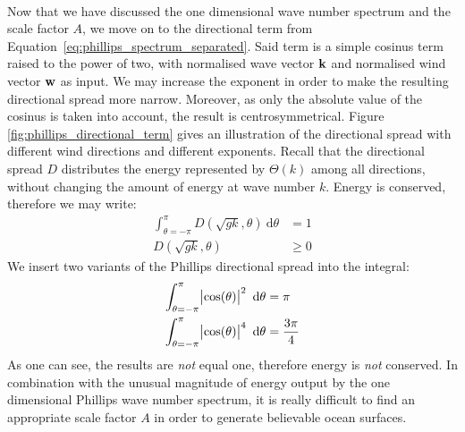%
\\

Now that we have discussed the one dimensional wave number spectrum and the 
scale factor $A$, we move on to the directional term from 
Equation~\ref{eq:phillips_spectrum_separated}. Said term is a simple cosinus 
term raised to the power of two, with normalised wave vector $\mathbf{k}$ and 
normalised wind vector $\mathbf{w}$ as input. We may increase the exponent in 
order to make the resulting directional spread more narrow. Moreover, as only
the  absolute value of the cosinus is taken into account, the result is
centrosymmetrical.
Figure \ref{fig:phillips_directional_term} gives an illustration of the directional 
spread with different wind directions and different exponents. Recall that the 
directional spread $D$ distributes the energy represented by $\Theta(k)$ among 
all directions, without changing the amount of energy at wave number $k$.  
Energy is conserved, therefore we may write:
\begin{subequations}
\begin{align}
\int_{\theta=-\pi}^{\pi}D(\sqrt{gk},\theta)~\mathrm{d}\theta &= 1 \\
D(\sqrt{gk},\theta) &\geq 0
\end{align}
\end{subequations}
We insert two variants of the Phillips directional spread into the integral:
\begin{subequations}
\begin{align}
\int_{\theta=-\pi}^{\pi} \abs{\cos(\theta)}^2~\mathrm{d}\theta &= \pi \\
\int_{\theta=-\pi}^{\pi} \abs{\cos(\theta)}^4~\mathrm{d}\theta &= \frac{3\pi}{4}
\end{align}
\end{subequations}
As one can see, the results are \emph{not} equal one, therefore energy is 
\emph{not} conserved. In combination with the unusual magnitude of energy 
output by the one dimensional Phillips wave number spectrum, it is really 
difficult to find an appropriate scale factor $A$ in order to generate 
believable ocean surfaces.
%
